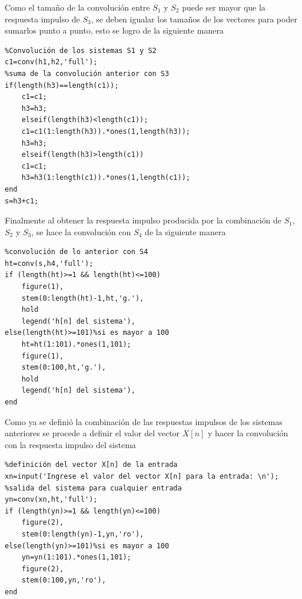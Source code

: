 \documentclass[onecolumn]{IEEEtran}
\begin{document}
\noindent
Como el tamaño de la convolución entre $S_1$ y $S_2$ puede ser mayor que la respuesta impulso de $S_3$, se deben igualar los tamaños de los vectores para poder sumarlos punto a punto, esto se logro de la siguiente manera
\begin{verbatim}
%Convolución de los sistemas S1 y S2
c1=conv(h1,h2,'full');
%suma de la convolución anterior con S3
if(length(h3)==length(c1));
	c1=c1;
	h3=h3;
	elseif(length(h3)<length(c1));
	c1=c1(1:length(h3)).*ones(1,length(h3));
	h3=h3;
	elseif(length(h3)>length(c1))
	c1=c1;
	h3=h3(1:length(c1)).*ones(1,length(c1));
end
s=h3+c1;
\end{verbatim}
\noindent
Finalmente al obtener la respuesta impulso producida por la combinación de $S_1$, $S_2$ y $S_3$, se hace la convolución con $S_4$ de la siguiente manera
\begin{verbatim}
%convolución de lo anterior con S4
ht=conv(s,h4,'full');
if (length(ht)>=1 && length(ht)<=100)
	figure(1),
	stem(0:length(ht)-1,ht,'g.'),
    hold
    legend('h[n] del sistema'),
else(length(ht)>=101)%si es mayor a 100
    ht=ht(1:101).*ones(1,101);
    figure(1),
    stem(0:100,ht,'g.'),
    hold
    legend('h[n] del sistema'),
end
\end{verbatim}
\noindent
Como ya se definió la combinación de las respuestas impulsos de los sistemas anteriores se procede a definir el valor del vector $X[n]$ y hacer la convolución con la respuesta impulso del sistema
\begin{verbatim}
%definición del vector X[n] de la entrada
xn=input('Ingrese el valor del vector X[n] para la entrada: \n');
%salida del sistema para cualquier entrada
yn=conv(xn,ht,'full');
if (length(yn)>=1 && length(yn)<=100)
	figure(2),
	stem(0:length(yn)-1,yn,'ro'),
else(length(yn)>=101)%si es mayor a 100
    yn=yn(1:101).*ones(1,101);
    figure(2),
    stem(0:100,yn,'ro'),
end
\end{verbatim}
\end{document}
